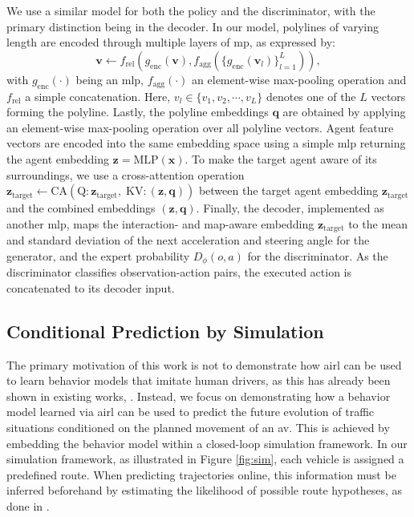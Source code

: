\documentclass[a4paper,12pt,onecolumn]{article}
\begin{document}
We use a similar model for both the policy and the discriminator, with the primary distinction being in the decoder. In our model, polylines of varying length are encoded through multiple layers of \gls{mp}, as expressed by:  
\begin{equation}
    \mathbf{v} \leftarrow f_\mathrm{rel} \left(g_\mathrm{enc} \left(  \mathbf{v} \right), f_\mathrm{agg} \left( \{g_\mathrm{enc} \left( \mathbf{v}_l \right)\}_{l=1}^L \right)  \right),
\end{equation} 
with $g_\mathrm{enc}(\cdot)$ being an \gls{mlp}, $f_\mathrm{agg}(\cdot)$ an element-wise max-pooling operation and $f_\mathrm{rel}$ a simple concatenation. Here, $v_l \in \{ v_1, v_2, \cdots, v_L \}$ denotes one of the $L$ vectors forming the polyline. Lastly, the polyline embeddings $\mathbf{q}$ are obtained by applying an element-wise max-pooling operation over all polyline vectors. 
Agent feature vectors are encoded into the same embedding space using a simple \gls{mlp} returning the agent embedding $\mathbf{z} = \mathrm{MLP}(\mathbf{x})$. To make the target agent aware of its surroundings, we use a cross-attention operation $\mathbf{z}_\mathrm{target} \leftarrow \mathrm{CA}\left(\mathrm{Q}\!: \mathbf{z}_\mathrm{target}, \; \mathrm{KV}\!: \left( \mathbf{z}, \mathbf{q}\right) \right)$ \cite{Vaswani17} between the target agent embedding $\mathbf{z}_\mathrm{target}$ and the combined embeddings $\left( \mathbf{z}, \mathbf{q}\right)$. Finally, the decoder, implemented as another \gls{mlp}, maps the interaction- and map-aware embedding $\mathbf{z}_\mathrm{target}$ to the mean and standard deviation of the next acceleration and steering angle for the generator, and the expert probability $D_\phi (o, a)$ for the discriminator. As the discriminator classifies observation-action pairs, the executed action is concatenated to its decoder input.


\subsection{Conditional Prediction by Simulation}\label{sec:conditional_prediction_by_simulation}

The primary motivation of this work is not to demonstrate how \gls{airl} can be used to learn behavior models that imitate human drivers, as this has already been shown in existing works, \eg \cite{Sackmann22AIRL, Konstantinidis24AIRL}. Instead, we focus on demonstrating how a behavior model learned via \gls{airl} can be used to predict the future evolution of traffic situations conditioned on the planned movement of an \gls{av}. This is achieved by embedding the behavior model within a closed-loop simulation framework. In our simulation framework, as illustrated in Figure \ref{fig:sim}, each vehicle is assigned a predefined route. When predicting trajectories online, this information must be inferred beforehand by estimating the likelihood of possible route hypotheses, as done in \cite{Schulz18}. 
\end{document}
